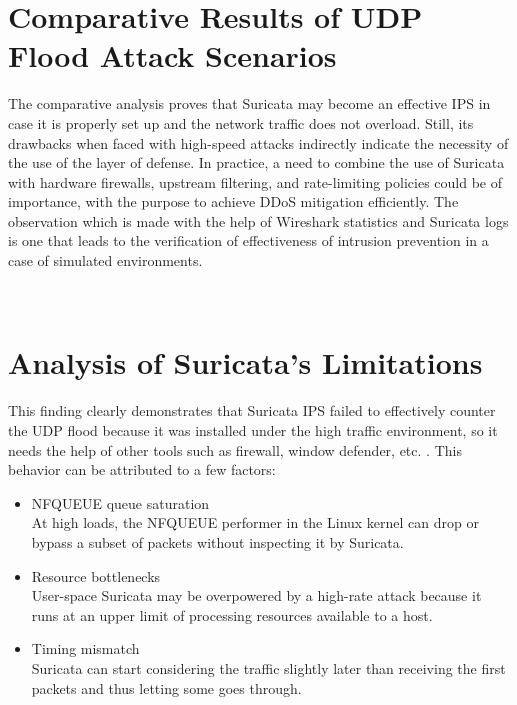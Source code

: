 \section{Comparative Results of UDP Flood Attack Scenarios}
The comparative analysis proves that Suricata may become an effective IPS in case it is properly set up and the network traffic does not overload. Still, its drawbacks when faced with high-speed attacks indirectly indicate the necessity of the use of the layer of defense. In practice, a need to combine the use of Suricata with hardware firewalls, upstream filtering, and rate-limiting policies could be of importance, with the purpose to achieve DDoS mitigation efficiently. The observation which is made with the help of Wireshark statistics and Suricata logs is one that leads to the verification of effectiveness of intrusion prevention in a case of simulated environments.
\begin{table}[!htb]
    \centering
    \caption{Summary Comparison Table}
    \label{tab:my_label}
\end{table}
\\
\section{Analysis of Suricata’s Limitations}
This finding clearly demonstrates that Suricata IPS failed to effectively counter the UDP flood because it was installed under the high traffic environment, so it needs the help of other tools such as firewall, window defender, etc. \cite{johnson2025suricata}. This behavior can be attributed to a few factors:
\begin{itemize}
\item NFQUEUE queue saturation \\
At high loads, the NFQUEUE performer in the Linux kernel can drop or bypass a subset of packets without inspecting it by Suricata.
\item Resource bottlenecks \\
User-space Suricata may be overpowered by a high-rate attack because it runs at an upper limit of processing resources available to a host.
\item Timing mismatch \\
Suricata can start considering the traffic slightly later than receiving the first packets and thus letting some goes through.

\end{itemize}
